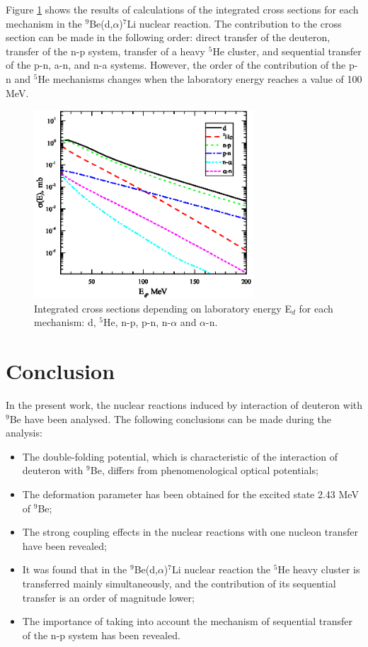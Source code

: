 \documentclass[10pt]{iopart}
\begin{document}
Figure \ref{CS} shows the results of calculations of the integrated cross sections for each mechanism in the ${}^9$Be(d,$\alpha$)${}^7$Li nuclear reaction. The contribution to the cross section can be made in the following order: direct transfer of the deuteron, transfer of the n-p system, transfer of a heavy ${}^5$He cluster,  and sequential transfer of the p-n, a-n, and n-a systems. However, the order of the contribution of the p-n and ${}^5$He mechanisms changes when the laboratory energy reaches a value of 100 MeV.

\begin{figure}[tp]
\centering
\includegraphics[width=8.2cm]{CS.eps}
\caption{\label{CS} Integrated cross sections depending on laboratory energy E$_d$ for each mechanism: d, ${}^5$He, n-p, p-n, n-$\alpha$ and $\alpha$-n. }
\end{figure}	
	
\section{Conclusion}
In the present work, the nuclear reactions induced by interaction of deuteron with ${}^9$Be  have been analysed. The following conclusions can be made during the analysis:
\begin{itemize}
\item The double-folding potential, which is characteristic of the interaction of deuteron with ${}^9$Be, differs from phenomenological optical potentials;
\item  The deformation parameter has been obtained for the excited state 2.43 MeV of ${}^9$Be;
\item The strong coupling effects in the nuclear reactions with one nucleon transfer have been revealed;
\item It was found that  in the ${}^9$Be(d,$\alpha$)${}^7$Li nuclear reaction the ${}^5$He heavy cluster  is transferred mainly simultaneously, and the contribution of its sequential transfer is an order of magnitude lower;
\item The importance of taking into account the mechanism of sequential transfer of the n-p system has been revealed.
\end{itemize}
\end{document}
